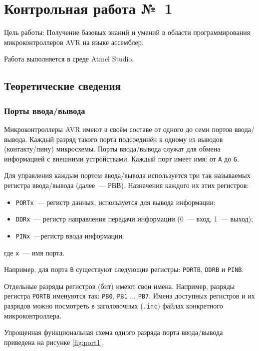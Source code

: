\documentclass[main.tex]{subfiles}
\begin{document}
\chapter{Контрольная работа №~1}

Цель работы: Получение базовых знаний и умений в области программирования микроконтроллеров AVR на языке ассемблер.

Работа выполняется в среде Atmel Studio.

\section{Теоретические сведения}

\subsection{Порты ввода/вывода}

Микроконтроллеры AVR имеют в своём составе от одного до семи портов ввода/вывода. Каждый разряд такого порта подсоединён к одному из выводов (контакту/пину) микросхемы. Порты ввода/вывода служат для обмена информацией с внешними устройствами. Каждый порт имеет имя: от \texttt{A} до \texttt{G}.

Для управления каждым портом ввода/вывода используется три так называемых регистра ввода/вывода (далее~--- РВВ). Назначения каждого их этих регистров:

\begin{itemize}
\item \texttt{PORTx}~--- регистр данных, используется для вывода информации;
\item \texttt{DDRx}~--- регистр направления передачи информации (0~--- вход, 1~--- выход);
\item \texttt{PINx}~---регистр ввода информации.
\end{itemize}
где \texttt{x}~--- имя порта.

Например, для порта \texttt{B} существуют следующие регистры: \texttt{PORTB}, \texttt{DDRB} и \texttt{PINB}. 

Отдельные разряды регистров (бит) имеют свои имена. Например, разряды регистра \texttt{PORTB} именуются так: \texttt{PB0}, \texttt{PB1} ... \texttt{PB7}. Имена доступных регистров и их разрядов можно посмотреть в заголовочных (\texttt{.inc}) файлах конкретного микроконтроллера.

Упрощенная функциональная схема одного разряда порта ввода/вывода приведена на рисунке \ref{fig:port1}.
\end{document}
